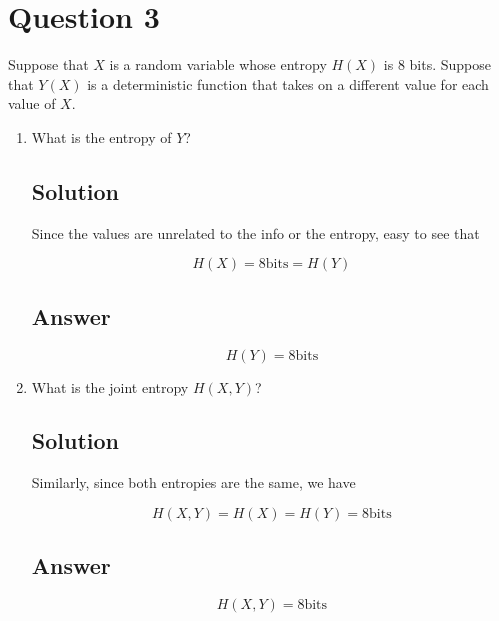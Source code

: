 \documentclass[12pt]{article}
\begin{document}
	
	\section*{Question 3}
	
	\noindent Suppose that $X$ is a random variable whose entropy $H(X)$ is $8$ bits. Suppose that $Y(X)$ is a deterministic function that takes on a different value for each value of $X$.
	
	\bigskip
	
	\begin{enumerate}[start=1,label={\bfseries Part \arabic*:},leftmargin=0in]
		\bigskip\item What is the entropy of $Y$?
		
		\subsection*{Solution}
		
			Since the values are unrelated to the info or the entropy, easy to see that
			
			\[H(X) = 8\text{bits} = H(Y)\]
		
		\subsection*{Answer}
		
		\[\boxed{H(Y) = 8 \text{bits}}\]
		
		\bigskip\item What is the joint entropy $H(X,Y)$?
		
		\subsection*{Solution}
		
			Similarly, since both entropies are the same, we have
			
			\[H(X, Y) = H(X) = H(Y) = 8 \text{bits}\]
		
		\subsection*{Answer}
		
		\[\boxed{H(X, Y) = 8 \text{bits}}\]
	\end{enumerate}
	
\end{document}
